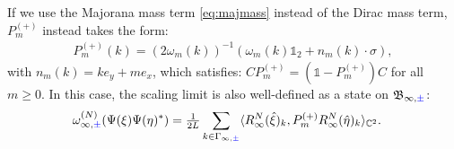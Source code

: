 \documentclass[a4paper, 11pt]{article}
\newcommand{\fB}{\mathfrak{B}}\newcommand{\cB}{\mathcal{B}}\newcommand{\dB}{\mathds{B}}\newcommand{\sB}{\mathscr{B}}
\DeclareMathOperator{\1}{\mathds{1}}
\begin{document}
If we use the Majorana mass term \eqref{eq:majmass} instead of the Dirac mass term, $P^{(+)}_{m}$ instead takes the form:
\begin{align}
\label{eq:majprojlim}
P^{(+)}_{m}(k) = (2\omega_{m}(k))^{-1}(\omega_{m}(k)\mathds{1}_{2} + n_{m}(k)\cdot\sigma),
\end{align}
with  $n_{m}(k) = k e_{y} + m e_{x}$, which satisfies: $CP^{(+)}_{m} = (\mathds{1}-P^{(+)}_{m})C$ for all $m\geq0$. In this case, the scaling limit is also well-defined as a state on $\fB_{\infty,{\color{blue}\pm}}$:
\begin{align}
\label{eq:scalinglimsdc}
\omega^{(N)}_{\infty,{\color{blue}\pm}}(\Psi(\xi)\Psi(\eta)^{*}) & = \tfrac{1}{2L}\sum_{k\in\Gamma_{\infty,{\color{blue}\pm}}}\langle R^{N}_{\infty}(\hat{\xi})_{k},P^{(+)}_{m} R^{N}_{\infty}(\hat{\eta})_{k}\rangle_{\mathbb{C}^{2}}.
\end{align}
\end{document}
